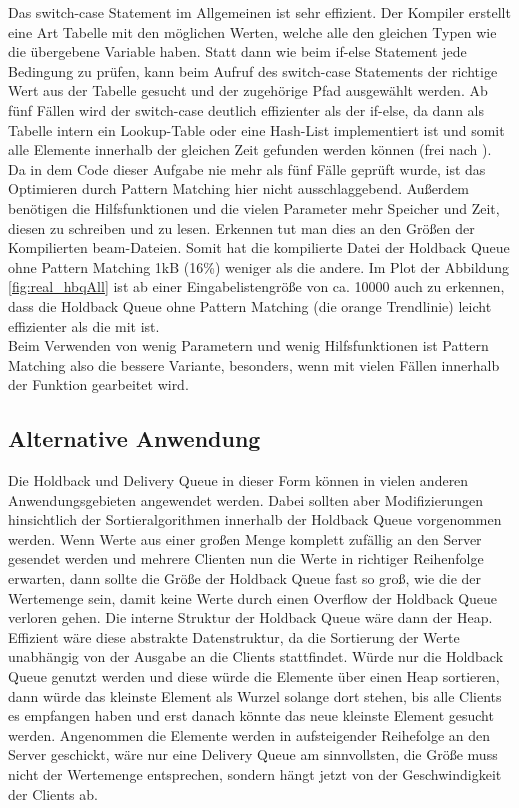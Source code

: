 Das switch-case Statement im Allgemeinen ist sehr effizient. Der Kompiler erstellt eine Art Tabelle mit den möglichen Werten, welche alle den gleichen Typen wie die übergebene Variable haben. Statt dann wie beim if-else Statement jede Bedingung zu prüfen, kann beim Aufruf des switch-case Statements der richtige Wert aus der Tabelle gesucht und der zugehörige Pfad ausgewählt werden. Ab fünf Fällen wird der switch-case deutlich effizienter als der if-else, da dann als Tabelle intern ein Lookup-Table oder eine Hash-List implementiert ist und somit alle Elemente innerhalb der gleichen Zeit gefunden werden können (frei nach \cite{geeksforgeeks}). Da in dem Code dieser Aufgabe nie mehr als fünf Fälle geprüft wurde, ist das Optimieren durch Pattern Matching hier nicht ausschlaggebend. Außerdem benötigen die Hilfsfunktionen und die vielen Parameter mehr Speicher und Zeit, diesen zu schreiben und zu lesen. Erkennen tut man dies an den Größen der Kompilierten beam-Dateien. Somit hat die kompilierte Datei der Holdback Queue ohne Pattern Matching 1kB (16\%) weniger als die andere. Im Plot der Abbildung \ref{fig:real_hbqAll} ist ab einer Eingabelistengröße von ca. 10000 auch zu erkennen, dass die Holdback Queue ohne Pattern Matching (die orange Trendlinie) leicht effizienter als die mit ist. \\
Beim Verwenden von wenig Parametern und wenig Hilfsfunktionen ist Pattern Matching also die bessere Variante, besonders, wenn mit vielen Fällen innerhalb der Funktion gearbeitet wird. 

\subsection{Alternative Anwendung}

Die Holdback und Delivery Queue in dieser Form können in vielen anderen Anwendungsgebieten angewendet werden. Dabei sollten aber Modifizierungen hinsichtlich der Sortieralgorithmen innerhalb der Holdback Queue vorgenommen werden. Wenn Werte aus einer großen Menge komplett zufällig an den Server gesendet werden und mehrere Clienten nun die Werte in richtiger Reihenfolge erwarten, dann sollte die Größe der Holdback Queue fast so groß, wie die der Wertemenge sein, damit keine Werte durch einen Overflow der Holdback Queue verloren gehen. Die interne Struktur der Holdback Queue wäre dann der Heap. Effizient wäre diese abstrakte Datenstruktur, da die Sortierung der Werte unabhängig von der Ausgabe an die Clients stattfindet. Würde nur die Holdback Queue genutzt werden und diese würde die Elemente über einen Heap sortieren, dann würde das kleinste Element als Wurzel solange dort stehen, bis alle Clients es empfangen haben und erst danach könnte das neue kleinste Element gesucht werden. 
Angenommen die Elemente werden in aufsteigender Reihefolge an den Server geschickt, wäre nur eine Delivery Queue am sinnvollsten, die Größe muss nicht der Wertemenge entsprechen, sondern hängt jetzt von der Geschwindigkeit der Clients ab.